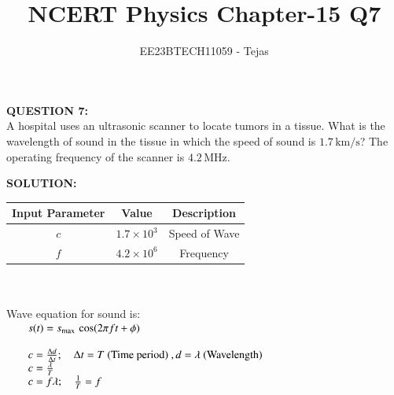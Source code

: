 \documentclass[journal,12pt,twocolumn]{IEEEtran}
\theoremstyle{remark}
\begin{document}


\vspace{3cm}

\title{NCERT Physics Chapter-15 Q7}
\author{EE23BTECH11059 - Tejas$^{}$}
\maketitle

\newpage

\Huge \textbf{QUESTION 7:} \\

\medskip
\Large
A hospital uses an ultrasonic scanner to locate tumors in a tissue. What is the
wavelength of sound in the tissue in which the speed of sound is $1.7 \, \text{km/s}$? The operating frequency of the scanner is $4.2 \, \text{MHz}$.

\bigskip
\Large
\textbf{SOLUTION:} \\
\begin{table}[h]
    \centering
    
    \begin{tabular}{|c|c|c|}
        \hline
        Input Parameter & Value & Description \\
        \hline
        $c$ & $1.7\times10^3$ & Speed of Wave  \\
        \hline
        $f$ & $4.2\times10^6$ & Frequency \\
        \hline
        
    \end{tabular}
    
\end{table} \\ \\
Wave equation for sound is: \\
$\begin{array}{ll}
\hspace{0.5cm} s(t)=s_{\text {max }}\cos(2\pi f t+\phi) \\ \\
\hspace{0.5cm}c=\frac{\Delta d}{\Delta t} ; \quad \Delta t=T \text { (Time period) } ,d=\lambda \text { (Wavelength) }  \\ 
\hspace{0.5cm}c=\frac{\lambda}{T}  \quad  \\ 
\hspace{0.5cm}c=f\lambda ; \quad \frac{1}{T}= f
\end{array}$ 
\end{document}
